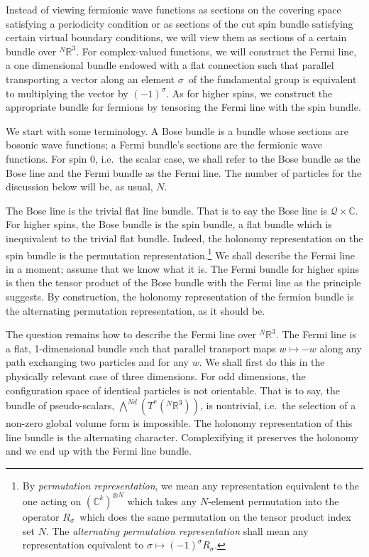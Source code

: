 \documentclass[11pt]{article}
\theoremstyle{remark}
\begin{document}
Instead of viewing fermionic wave functions as sections on the covering space
satisfying a periodicity condition or as sections of the cut spin bundle
satisfying certain virtual boundary conditions, we will view them as
sections of a certain bundle over
\ensuremath{{}^N\ensuremath{\mathbb{R}^{\ensuremath{3}}}}. For
complex-valued functions, we will construct the Fermi line, a one
dimensional bundle endowed with a flat connection such that parallel
transporting a vector along an element \ensuremath{\sigma}\ of the fundamental group 
 is equivalent to
multiplying the vector by $(-1)^{\ensuremath{\sigma}}$. 
As for
higher spins, we construct the appropriate bundle for fermions 
by tensoring the Fermi
line with the spin bundle. 

We start with some terminology. 
 A Bose bundle is a
bundle whose sections are bosonic wave functions; a Fermi bundle's  sections
 are the fermionic wave functions.
For spin 0, i.e.\ the scalar case,  we shall refer to the
Bose bundle as  the Bose
line and the Fermi bundle as the Fermi line. 
 The number of particles for the discussion below will be, as usual, 
 $N$.


The Bose line is the trivial flat line bundle. That is to say the Bose
line is $\ensuremath{\mathcal{Q}} \times \ensuremath{\mathbb{C}}$. 
For higher spins, the Bose bundle is the spin bundle, 
 a flat bundle which is inequivalent to the trivial flat
 bundle. Indeed, the
holonomy representation on the spin bundle is the permutation
 representation.\footnote{   
By  \emph{permutation representation}, we mean any representation
 equivalent to the one acting on $(\ensuremath{\mathbb{C}}^k)^{\otimes
 N}$  which takes any $N$-element permutation into the
 operator \ensuremath{R_{{\ensuremath{\sigma}}}}\ which does the same permutation on the tensor product index
 set $N$. 
The \emph{alternating permutation
representation} shall mean any representation equivalent to $\ensuremath{\sigma}
\mapsto (-1)^{\ensuremath{\sigma}} \ensuremath{R_{{\ensuremath{\sigma}}}}$.
}    
We shall describe the Fermi line in a
moment; assume  that we know what it is. 
The Fermi bundle for higher spins is then the tensor product of the
Bose bundle with the Fermi line as the principle suggests. 
By construction, the holonomy representation of 
the fermion bundle is the alternating permutation representation, as
 it should be.

The question remains how to describe  the Fermi line over \ensuremath{{}^N\ensuremath{\mathbb{R}^{\ensuremath{3}}}}. The
 Fermi line is a flat, 1-dimensional
 bundle such that parallel transport maps   
$w \mapsto -w$ along any path exchanging two particles and for any $w$. 
 We shall first do this in the physically relevant case
 of three dimensions.
For odd dimensions, the configuration space of identical particles is not
orientable. That is to say, the bundle of pseudo-scalars, 
$\bigwedge^{Nd}(T^{*}(\ensuremath{{}^N\ensuremath{\mathbb{R}^{\ensuremath{3}}}}))$, is nontrivial, i.e.\ the selection of a
non-zero global volume form is impossible. The holonomy
representation of this line bundle 
is the alternating character. Complexifying it preserves the 
holonomy and we end up with the Fermi line bundle. 
\end{document}
